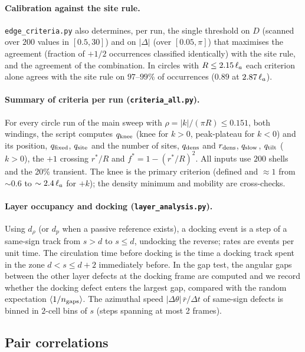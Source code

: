 \paragraph{Calibration against the site rule.}
\texttt{edge\_criteria.py} also determines, per run, the single threshold on $D$ (scanned over $200$ values
in $[0.5,30]$) and on $|\Delta|$ (over $[0.05,\pi]$) that maximises the agreement (fraction of $+1/2$
occurrences classified identically) with the site rule, and the agreement of the combination. In circles
with $R\le2.15\,\ell_a$ each criterion alone agrees with the site rule on $97$--$99\%$ of occurrences
($0.89$ at $2.87\,\ell_a$).

\paragraph{Summary of criteria per run (\texttt{criteria\_all.py}).}
For every circle run of the main sweep with $\rho=|k|/(\pi R)\le0.151$, both windings, the script computes
$q_{\rm knee}$ (knee for $k>0$, peak-plateau for $k<0$) and its position, $q_{\rm fixed}$, $q_{\rm site}$
and the number of sites, $q_{\rm dens}$ and $r_{\rm dens}$, $q_{\rm slow}$, $q_{\rm tilt}$ ($k>0$), the
$+1$ crossing $r^*/R$ and $f^*=1-(r^*/R)^2$. All inputs use $200$ shells and the 20\% transient.
The knee is the primary criterion (defined and $\approx1$ from $\sim0.6$ to $\sim2.4\,\ell_a$ for $+k$); the
density minimum and mobility are cross-checks.

\paragraph{Layer occupancy and docking (\texttt{layer\_analysis.py}).}
Using $d_\rho$ (or $d_p$ when a passive reference exists), a docking event is a step of a same-sign track
from $s>d$ to $s\le d$, undocking the reverse; rates are events per unit time. The circulation time before
docking is the time a docking track spent in the zone $d<s\le d+2$ immediately before. In the gap test, the
angular gaps between the other layer defects at the docking frame are computed and we record whether the
docking defect enters the largest gap, compared with the random expectation $\langle 1/n_{\rm gaps}\rangle$.
The azimuthal speed $|\Delta\theta|\,\bar r/\Delta t$ of same-sign defects is binned in $2$-cell bins of $s$
(steps spanning at most 2 frames).

\subsection{Pair correlations}
\label{sec:methods-gr}\label{sec:m-gr}

